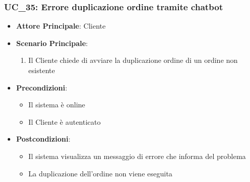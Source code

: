 \subsubsection{UC\_35: Errore duplicazione ordine tramite chatbot}
\label{uc_35}

\begin{itemize}
    \item \textbf{Attore Principale}: Cliente
	 \item \textbf{Scenario Principale}:
	 \begin{enumerate}
		\item Il Cliente chiede di avviare la duplicazione ordine di un ordine non esistente
	 \end{enumerate}
	\item \textbf{Precondizioni}:
	\begin{itemize}
		\item Il sistema è online
		\item Il Cliente è autenticato
	\end{itemize}
	\item \textbf{Postcondizioni}:
	\begin{itemize}
		\item Il sistema visualizza un messaggio di errore che informa del problema
		\item La duplicazione dell'ordine non viene eseguita
	\end{itemize}
\end{itemize}